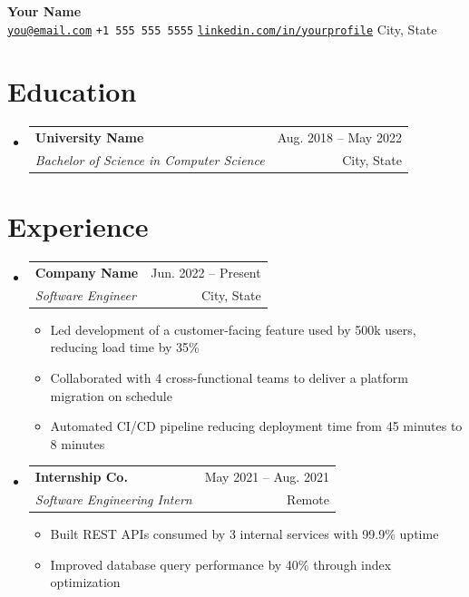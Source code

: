 \documentclass[letterpaper,11pt]{article}
\makeatletter
\newcommand{\resumeItem}[1]{
  \item\small{#1 \vspace{-1pt}}
}
\newcommand{\resumeSubheading}[4]{
  \vspace{-1pt}\item
    \begin{tabular*}{\textwidth}[t]{l@{\extracolsep{\fill}}r}
      \textbf{\color{textbase}#1} & {\color{midgray}\small #2} \\
      \textit{\small\color{darkgray}#3} & {\color{midgray}\small #4} \\
    \end{tabular*}\vspace{-4pt}
}
\newcommand{\resumeSubHeadingListStart}{\begin{itemize}[leftmargin=0in,label={}]}
\newcommand{\resumeSubHeadingListEnd}{\end{itemize}}
\newcommand{\resumeItemListStart}{\begin{itemize}[leftmargin=0.15in,label={\color{tealprimary}\small\textbullet}]}
\newcommand{\resumeItemListEnd}{\end{itemize}\vspace{0pt}}
\makeatother
\begin{document}
\begin{center}
    {\Huge\bfseries\color{tealprimary} Your Name} \\[4pt]
    \small
    \href{mailto:you@email.com}{\texttt{you@email.com}}
    \hspace{4pt}{\color{tealprimary}|}\hspace{4pt}
    \texttt{+1 555 555 5555}
    \hspace{4pt}{\color{tealprimary}|}\hspace{4pt}
    \href{https://linkedin.com/in/yourprofile}{\texttt{linkedin.com/in/yourprofile}}
    \hspace{4pt}{\color{tealprimary}|}\hspace{4pt}
    City, State
\end{center}

\vspace{-6pt}

\section{Education}
\resumeSubHeadingListStart

\resumeSubheading
{University Name}{Aug. 2018 -- May 2022}
{Bachelor of Science in Computer Science}{City, State}

\resumeSubHeadingListEnd

\section{Experience}
\resumeSubHeadingListStart

\resumeSubheading
{Company Name}{Jun. 2022 -- Present}
{Software Engineer}{City, State}
\resumeItemListStart
\resumeItem{Led development of a customer-facing feature used by 500k users, reducing load time by 35\%}
\resumeItem{Collaborated with 4 cross-functional teams to deliver a platform migration on schedule}
\resumeItem{Automated CI/CD pipeline reducing deployment time from 45 minutes to 8 minutes}
\resumeItemListEnd

\resumeSubheading
{Internship Co.}{May 2021 -- Aug. 2021}
{Software Engineering Intern}{Remote}
\resumeItemListStart
\resumeItem{Built REST APIs consumed by 3 internal services with 99.9\% uptime}
\resumeItem{Improved database query performance by 40\% through index optimization}
\resumeItemListEnd

\resumeSubHeadingListEnd
\end{document}
